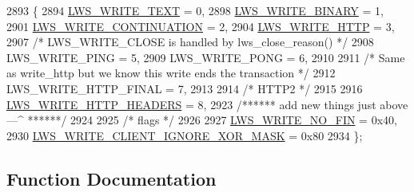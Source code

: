 \begin{DoxyCode}
2893                         \{
2894         \hyperlink{group__sending-data_gga98b099cf8c1c7e38ad78501f270e193da80e8f169fda236c56bfb795ed62903db}{LWS\_WRITE\_TEXT}                                            = 0,
2898         \hyperlink{group__sending-data_gga98b099cf8c1c7e38ad78501f270e193daf6486c0dba50c44198100717721d9ab2}{LWS\_WRITE\_BINARY}                                        = 1,
2901         \hyperlink{group__sending-data_gga98b099cf8c1c7e38ad78501f270e193da10047eb05b5e1c298151dc47a5b44826}{LWS\_WRITE\_CONTINUATION}                                    = 2,
2904         \hyperlink{group__sending-data_gga98b099cf8c1c7e38ad78501f270e193dabb6705e1d1327cdda5025be28f07712e}{LWS\_WRITE\_HTTP}                                            = 3,
2907         \textcolor{comment}{/* LWS\_WRITE\_CLOSE is handled by lws\_close\_reason() */}
2908         LWS\_WRITE\_PING                                          = 5,
2909         LWS\_WRITE\_PONG                                          = 6,
2910 
2911         \textcolor{comment}{/* Same as write\_http but we know this write ends the transaction */}
2912         LWS\_WRITE\_HTTP\_FINAL                                    = 7,
2913 
2914         \textcolor{comment}{/* HTTP2 */}
2915 
2916         \hyperlink{group__sending-data_gga98b099cf8c1c7e38ad78501f270e193dafe5a38e940ce56708ac814627e9c0917}{LWS\_WRITE\_HTTP\_HEADERS}                                    = 8,
2923         \textcolor{comment}{/****** add new things just above ---^ ******/}
2924 
2925         \textcolor{comment}{/* flags */}
2926 
2927         \hyperlink{group__sending-data_gga98b099cf8c1c7e38ad78501f270e193da115440f272a5d55518adfc8099acfee3}{LWS\_WRITE\_NO\_FIN} = 0x40,
2930         \hyperlink{group__sending-data_gga98b099cf8c1c7e38ad78501f270e193da220d8e8652d9b97fb66e476e2a60ffce}{LWS\_WRITE\_CLIENT\_IGNORE\_XOR\_MASK} = 0x80
2934 \};
\end{DoxyCode}


\subsection{Function Documentation}
